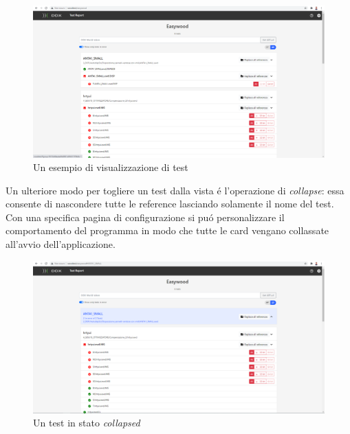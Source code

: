             \begin{figure}[h!]
                \includegraphics[width=\textwidth]{images/page.png}
                \caption{Un esempio di visualizzazione di test}
            \end{figure}

            Un ulteriore modo per togliere un test dalla vista \'e l'operazione di \textit{collapse}: essa consente di nascondere tutte le reference lasciando solamente il nome del test.
            Con una specifica pagina di configurazione si pu\'o personalizzare il comportamento del programma in modo che tutte le card vengano collassate all'avvio dell'applicazione.
            
            \begin{figure}[h!]
                \includegraphics[width=\textwidth]{images/collpapsed.png}
                \caption{Un test in stato \textit{collapsed}}
            \end{figure}
            

